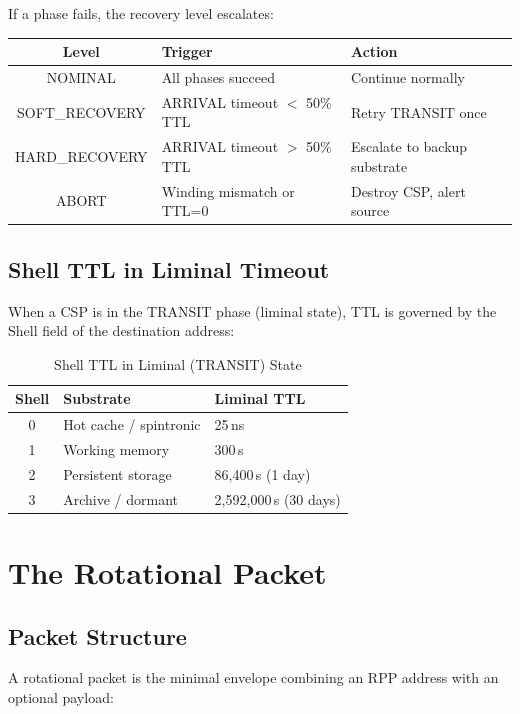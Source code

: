 \documentclass[11pt,a4paper]{article}
\begin{document}
If a phase fails, the recovery level escalates:

\begin{center}
\begin{tabular}{|c|l|l|}
\hline
\textbf{Level} & \textbf{Trigger} & \textbf{Action} \\
\hline
NOMINAL & All phases succeed & Continue normally \\
SOFT\_RECOVERY & ARRIVAL timeout $<$ 50\% TTL & Retry TRANSIT once \\
HARD\_RECOVERY & ARRIVAL timeout $>$ 50\% TTL & Escalate to backup substrate \\
ABORT & Winding mismatch or TTL=0 & Destroy CSP, alert source \\
\hline
\end{tabular}
\end{center}

\subsection{Shell TTL in Liminal Timeout}

When a CSP is in the TRANSIT phase (liminal state), TTL is governed by the Shell field of the destination address:

\begin{table}[h]
\centering
\begin{tabular}{cll}
\toprule
\textbf{Shell} & \textbf{Substrate} & \textbf{Liminal TTL} \\
\midrule
0 & Hot cache / spintronic & 25\,ns \\
1 & Working memory & 300\,s \\
2 & Persistent storage & 86{,}400\,s (1 day) \\
3 & Archive / dormant & 2{,}592{,}000\,s (30 days) \\
\bottomrule
\end{tabular}
\caption{Shell TTL in Liminal (TRANSIT) State}
\label{tab:ttl}
\end{table}

\section{The Rotational Packet}

\subsection{Packet Structure}

A rotational packet is the minimal envelope combining an RPP address with an optional payload:
\end{document}
